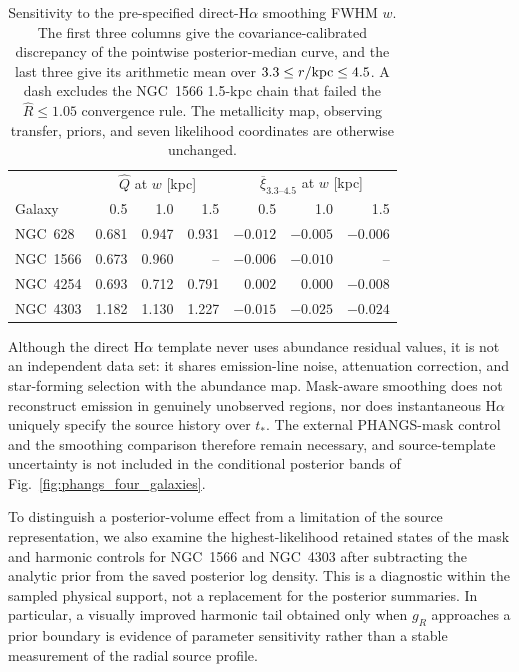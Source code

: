 \documentclass[fleqn,usenatbib]{mnras}
\begin{document}
\begin{table}
\centering
\small
\caption{Sensitivity to the pre-specified direct-H$\alpha$ smoothing FWHM $w$.  The first three columns give the covariance-calibrated discrepancy of the pointwise posterior-median curve, and the last three give its arithmetic mean over $3.3\leq r/{\rm kpc}\leq4.5$.  A dash excludes the NGC~1566 1.5-kpc chain that failed the $\widehat R\leq1.05$ convergence rule.  The metallicity map, observing transfer, priors, and seven likelihood coordinates are otherwise unchanged.}
\label{tab:phangs_halpha_smoothing}
\begin{tabular}{@{}lrrrrrr@{}}
\toprule
 & \multicolumn{3}{c}{$\widehat Q$ at $w$ [kpc]} & \multicolumn{3}{c}{$\overline\xi_{3.3\text{--}4.5}$ at $w$ [kpc]}\\
Galaxy & 0.5 & 1.0 & 1.5 & 0.5 & 1.0 & 1.5\\
\midrule
NGC~628  & 0.681 & 0.947 & 0.931 & $-0.012$ & $-0.005$ & $-0.006$\\
NGC~1566 & 0.673 & 0.960 & --    & $-0.006$ & $-0.010$ & --\\
NGC~4254 & 0.693 & 0.712 & 0.791 & $ 0.002$ & $ 0.000$ & $-0.008$\\
NGC~4303 & 1.182 & 1.130 & 1.227 & $-0.015$ & $-0.025$ & $-0.024$\\
\bottomrule
\end{tabular}
\end{table}

Although the direct H$\alpha$ template never uses abundance residual values, it is not an independent data set: it shares emission-line noise, attenuation correction, and star-forming selection with the abundance map.  Mask-aware smoothing does not reconstruct emission in genuinely unobserved regions, nor does instantaneous H$\alpha$ uniquely specify the source history over $t_\ast$.  The external PHANGS-mask control and the smoothing comparison therefore remain necessary, and source-template uncertainty is not included in the conditional posterior bands of Fig.~\ref{fig:phangs_four_galaxies}.

To distinguish a posterior-volume effect from a limitation of the source representation, we also examine the highest-likelihood retained states of the mask and harmonic controls for NGC~1566 and NGC~4303 after subtracting the analytic prior from the saved posterior log density.  This is a diagnostic within the sampled physical support, not a replacement for the posterior summaries.  In particular, a visually improved harmonic tail obtained only when $g_R$ approaches a prior boundary is evidence of parameter sensitivity rather than a stable measurement of the radial source profile.
\end{document}

